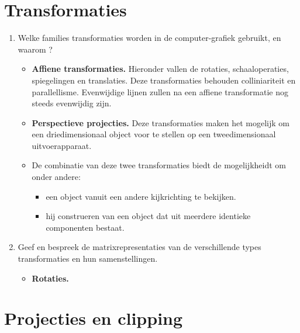 \documentclass{report}
\newcommand{\vraag}[2]{
	\item #1
	
	#2
}
\begin{document}
	\section{Transformaties}
	\begin{enumerate}
	\vraag
	{
		Welke families transformaties worden in de computer-grafiek gebruikt, en waarom ?
	}
	{
		\begin{itemize}
			\item \textbf{Affiene transformaties.} Hieronder vallen de rotaties, schaaloperaties, spiegelingen en translaties. Deze transformaties behouden colliniariteit en parallellisme. Evenwijdige lijnen zullen na een affiene transformatie nog steeds evenwijdig zijn. 
			
			\item \textbf{Perspectieve projecties.} Deze transformaties maken het mogelijk om een driedimensionaal object voor te stellen op een tweedimensionaal uitvoerapparaat.
			
			\item De combinatie van deze twee transformaties biedt de mogelijkheidt om onder andere:
			\begin{itemize}
				\item een object vanuit een andere kijkrichting te bekijken.
				\item hij construeren van een object dat uit meerdere identieke componenten bestaat. 
			\end{itemize}
		\end{itemize}	
	}
	
	\vraag 
	{
		Geef en bespreek de matrixrepresentaties van de verschillende types transformaties en hun samenstellingen. \accentuate{(§2.1 behalve §2.1.4)}	
	}
	{
		\begin{itemize}
			\item \textbf{Rotaties.} 
		\end{itemize}
	}
	\end{enumerate}

	\section{Projecties en clipping}
\end{document}

